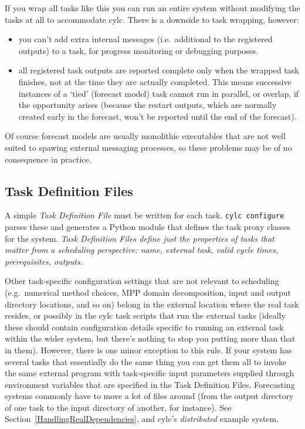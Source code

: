 \documentclass[11pt,a4paper]{article}
\begin{document}
If you wrap all tasks like this you can run an entire system without
modifying the tasks at all to accommodate cylc. There is a downside to
task wrapping, however:

\begin{itemize}
    \item you can't add extra internal messages (i.e.\ additional to the
        registered outputs) to a task, for progress monitoring or
        debugging purposes.
    \item all registered task outputs are reported complete only
        when the wrapped task finishes, not at the time they are actually
        completed. This means successive instances of a `tied' (forecast
        model) task cannot run in parallel, or overlap, if the
        opportunity arises (because the restart outputs, which are
        normally created early in the forecast, won't be reported until
        the end of the forecast).
\end{itemize} 

Of course forecast models are usually monolithic executables that are not
well suited to spawing external messaging processes, so these problems
may be of no consequence in practice.

\pagebreak

\subsection{Task Definition Files} 
\label{TaskDefinitionFiles}

A simple {\em Task Definition File} must be written for each task.
\lstinline=cylc configure= parses these and generates a Python module
that defines the task proxy classes for the system. {\em Task
Definition Files define just the properties of tasks that matter from a
scheduling perspective: name, external task, valid cycle times,
prerequisites, outputs.} 

Other task-specific configuration settings that are not relevant to
scheduling (e.g.\ numerical method choices, MPP
domain decomposition, input and output directory locations, and so on)
belong in the external location where the real task resides, or possibly
in the cylc task scripts that run the external tasks (ideally these
should contain configuration details specific to running an external
task within the wider system, but there's nothing to stop you putting
more than that in them). However, there is one minor exception to this
rule. If your system has several tasks that essentially do the same
thing you can get them all to invoke the same external program with
task-specific input parameters supplied through environment variables
that are specified in the Task Definition Files. Forecasting systems
commonly have to move a lot of files around (from the output
directory of one task to the input directory of another, for
instance). See Section~\ref{HandlingRealDependencies}, and cylc's
{\em distributed} example system. 
\end{document}
